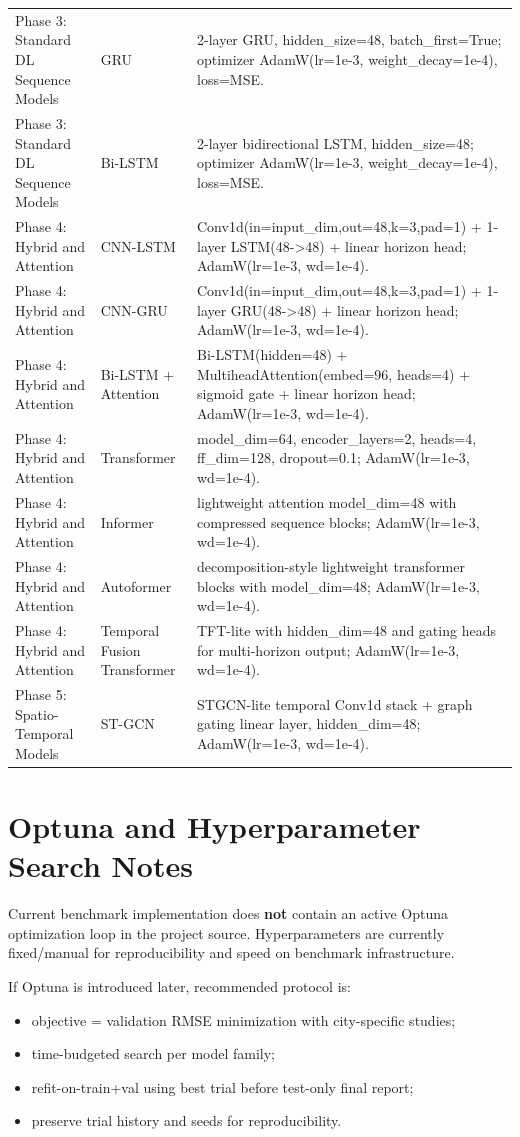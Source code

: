 \documentclass[11pt,a4paper,oneside]{book}
\begin{document}
\begin{longtable}{@{}llp{9cm}@{}}
Phase 3: Standard DL Sequence Models & GRU & 2-layer GRU, hidden\_size=48, batch\_first=True; optimizer AdamW(lr=1e-3, weight\_decay=1e-4), loss=MSE. \\
Phase 3: Standard DL Sequence Models & Bi-LSTM & 2-layer bidirectional LSTM, hidden\_size=48; optimizer AdamW(lr=1e-3, weight\_decay=1e-4), loss=MSE. \\
Phase 4: Hybrid and Attention & CNN-LSTM & Conv1d(in=input\_dim,out=48,k=3,pad=1) + 1-layer LSTM(48->48) + linear horizon head; AdamW(lr=1e-3, wd=1e-4). \\
Phase 4: Hybrid and Attention & CNN-GRU & Conv1d(in=input\_dim,out=48,k=3,pad=1) + 1-layer GRU(48->48) + linear horizon head; AdamW(lr=1e-3, wd=1e-4). \\
Phase 4: Hybrid and Attention & Bi-LSTM + Attention & Bi-LSTM(hidden=48) + MultiheadAttention(embed=96, heads=4) + sigmoid gate + linear horizon head; AdamW(lr=1e-3, wd=1e-4). \\
Phase 4: Hybrid and Attention & Transformer & model\_dim=64, encoder\_layers=2, heads=4, ff\_dim=128, dropout=0.1; AdamW(lr=1e-3, wd=1e-4). \\
Phase 4: Hybrid and Attention & Informer & lightweight attention model\_dim=48 with compressed sequence blocks; AdamW(lr=1e-3, wd=1e-4). \\
Phase 4: Hybrid and Attention & Autoformer & decomposition-style lightweight transformer blocks with model\_dim=48; AdamW(lr=1e-3, wd=1e-4). \\
Phase 4: Hybrid and Attention & Temporal Fusion Transformer & TFT-lite with hidden\_dim=48 and gating heads for multi-horizon output; AdamW(lr=1e-3, wd=1e-4). \\
Phase 5: Spatio-Temporal Models & ST-GCN & STGCN-lite temporal Conv1d stack + graph gating linear layer, hidden\_dim=48; AdamW(lr=1e-3, wd=1e-4). \\
\bottomrule
\end{longtable}

\chapter{Optuna and Hyperparameter Search Notes}
Current benchmark implementation does \textbf{not} contain an active Optuna optimization loop in the project source.  
Hyperparameters are currently fixed/manual for reproducibility and speed on benchmark infrastructure.

If Optuna is introduced later, recommended protocol is:
\begin{itemize}
  \item objective = validation RMSE minimization with city-specific studies;
  \item time-budgeted search per model family;
  \item refit-on-train+val using best trial before test-only final report;
  \item preserve trial history and seeds for reproducibility.
\end{itemize}
\end{document}
